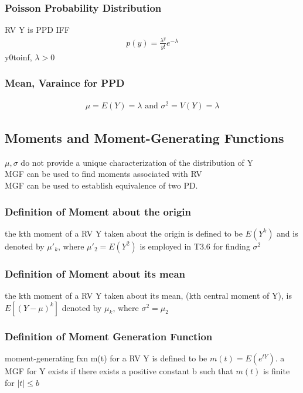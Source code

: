 \documentclass[12pt]{article}
\begin{document}
    \subsubsection{Poisson Probability Distribution}
        RV Y is PPD IFF
        \begin{align*}
            p(y) = \frac{\lambda ^{y}}{y!}e^{-\lambda } 
        \end{align*}
        y0toinf, $ \lambda > 0 $
    \subsubsection{Mean, Varaince for PPD}
    \begin{align*}
        \mu = E(Y) = \lambda \text{ and } \sigma ^2 = V(Y) = \lambda 
    \end{align*}

\subsection{Moments and Moment-Generating Functions}
    $ \mu ,\sigma  $ do not provide a unique characterization of
    the distribution of Y\\
    MGF can be used to find moments associated with RV\\
    MGF can be used to establish equivalence of two PD.
    \subsubsection{Definition of Moment about the origin}
        the kth moment of a RV Y taken about the origin is defined to be
        $ E(Y^{k}) $ and is denoted by $ \mu '_{k} $, where 
        $ \mu'_{2} = E(Y^2 ) $ is employed in T3.6 for finding $ \sigma^2  $
    \subsubsection{Definition of Moment about its mean}
        the kth moment of a RV Y taken about its mean, 
        (kth central moment of Y), is $ E[(Y-\mu )^{k}] $ denoted by
        $ \mu _{k} $, where $ \sigma ^2 = \mu _{2} $
    \subsubsection{Definition of Moment Generation Function}
        moment-generating fxn m(t) for a RV Y is defined to be 
        $ m(t) = E(e^{tY}) $. a MGF for Y exists if there exists a positive
        constant b such that $ m(t) $ is finite for $ |t| \le b $
\end{document}
